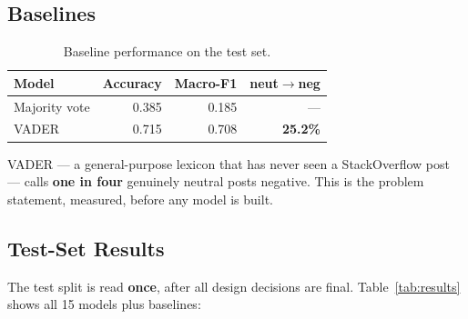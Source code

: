 \documentclass[11pt,a4paper]{article}
\begin{document}
\subsection{Baselines}

\begin{table}[H]
\centering
\caption{Baseline performance on the test set.}
\begin{tabular}{lrrr}
\toprule
\textbf{Model} & \textbf{Accuracy} & \textbf{Macro-F1} & \textbf{neut$\rightarrow$neg} \\
\midrule
Majority vote & 0.385 & 0.185 & --- \\
VADER         & 0.715 & 0.708 & \textbf{25.2\%} \\
\bottomrule
\end{tabular}
\end{table}

VADER --- a general-purpose lexicon that has never seen a StackOverflow post --- calls \textbf{one in four} genuinely neutral posts negative. This is the problem statement, measured, before any model is built.

\subsection{Test-Set Results}

The test split is read \textbf{once}, after all design decisions are final. Table~\ref{tab:results} shows all 15 models plus baselines:
\end{document}
